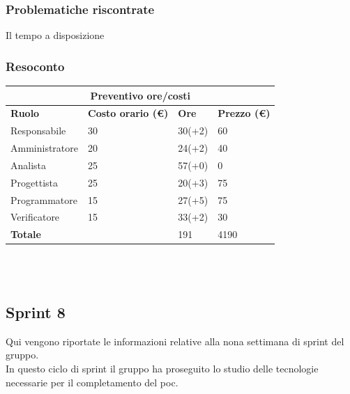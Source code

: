 \documentclass[12pt]{article}
\begin{document}
\subsubsection{Problematiche riscontrate}
Il tempo a disposizione

\subsubsection{Resoconto}
\begin{center}
	\begin{tabularx}{\textwidth}{|X|X|X|X|}
		\hline
		\multicolumn{4}{|c|}{\textbf{Preventivo ore/costi}}                                      \\
		\hline
		\hline
		\textbf{Ruolo}  & \textbf{Costo orario (\euro)} & \textbf{Ore} & \textbf{Prezzo (\euro)} \\
		\hline
		Responsabile    & 30                            & 30(+2)       & 60                      \\
		\hline
		Amministratore  & 20                            & 24(+2)       & 40                      \\
		\hline
		Analista        & 25                            & 57(+0)       & 0                       \\
		\hline
		Progettista     & 25                            & 20(+3)       & 75                      \\
		\hline
		Programmatore   & 15                            & 27(+5)       & 75                      \\
		\hline
		Verificatore    & 15                            & 33(+2)       & 30                      \\
		\hline
		\hline
		\textbf{Totale} &                               & 191          & 4190                    \\
		\hline
	\end{tabularx}\\[8pt]
	\mbox{}\\
\end{center}

\subsection{Sprint 8}
Qui vengono riportate le informazioni relative alla nona settimana di sprint del gruppo. \\
In questo ciclo di sprint il gruppo ha proseguito lo studio delle tecnologie necessarie per il completamento del poc. \\
\end{document}
